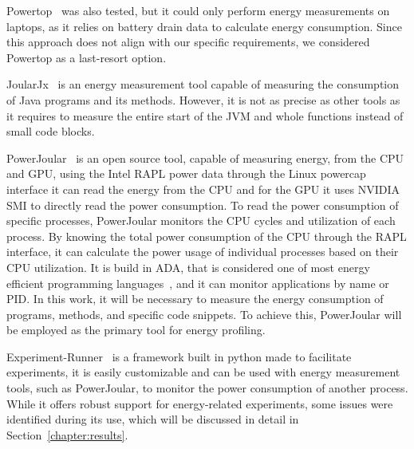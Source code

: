 Powertop~\cite{archlinux_powertop} was also tested, but it could only perform energy measurements on laptops, as it relies on battery drain data to calculate energy consumption. Since this approach does not align with our specific requirements, we considered Powertop as a last-resort option.

JoularJx~\cite{noureddine-ie-2022} is an energy measurement tool capable of measuring the consumption of Java programs and its methods. However, it is not as precise as other tools as it requires to measure the entire start of the JVM and whole functions instead of small code blocks.

PowerJoular~\cite{noureddine-ie-2022} is an open source tool, capable of measuring energy, from the CPU and GPU, using the Intel RAPL power data through the Linux powercap interface it can read the energy from the CPU and for the GPU it uses NVIDIA SMI to directly read the power consumption.
To read the power consumption of specific processes, PowerJoular monitors the CPU cycles and utilization of each process. By knowing the total power consumption of the CPU through the RAPL interface, it can calculate the power usage of individual processes based on their CPU utilization.
It is build in ADA, that is considered one of most energy efficient programming languages~\cite{PEREIRA2021102609}, and it can monitor applications by name or PID. In this work, it will be necessary to measure the energy consumption of programs, methods, and specific code snippets. To achieve this, PowerJoular will be employed as the primary tool for energy profiling.

Experiment-Runner~\cite{S2_Group_Experiment_Runner} is a framework built in python made to facilitate experiments, it is easily customizable and can be used with energy measurement tools, such as PowerJoular, to monitor the power consumption of another process. While it offers robust support for energy-related experiments, some issues were identified during its use, which will be discussed in detail in Section~\ref{chapter:results}.

